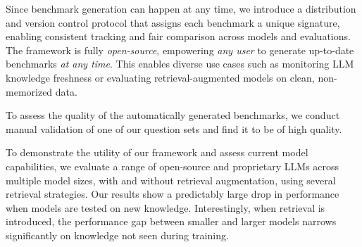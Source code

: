 \documentclass[11pt]{article}
\newcommand{\name}{{\textbf{OKBench}}}
\begin{document}
Since benchmark generation can happen at any time, we introduce a distribution and version control protocol that assigns each benchmark a unique signature, enabling consistent tracking and fair comparison across models and evaluations. 
The framework is fully \emph{open-source}, empowering \emph{any user} to generate up-to-date benchmarks \emph{at any time}.
This enables diverse use cases such as monitoring LLM knowledge freshness or evaluating retrieval-augmented models on clean, non-memorized data. 

To assess the quality of the automatically generated benchmarks, we conduct manual validation of one of our question sets and find it to be of high quality.

%
To demonstrate the utility of our framework and assess %
current model capabilities, we evaluate a range of open-source and proprietary LLMs across multiple model sizes, with and without retrieval augmentation, using several retrieval strategies. Our results %
show a predictably large drop in performance when models are tested on new
knowledge.
Interestingly, when retrieval is introduced, the performance gap between smaller and larger models narrows significantly on knowledge not seen during training. 

\end{document}
